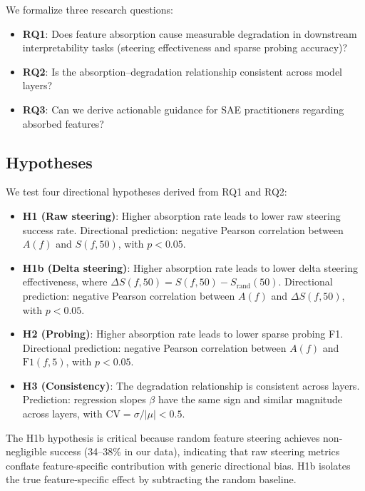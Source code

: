 \documentclass{article}
\begin{document}
We formalize three research questions:

\begin{itemize}
    \item \textbf{RQ1}: Does feature absorption cause measurable degradation in downstream interpretability tasks (steering effectiveness and sparse probing accuracy)?
    \item \textbf{RQ2}: Is the absorption--degradation relationship consistent across model layers?
    \item \textbf{RQ3}: Can we derive actionable guidance for SAE practitioners regarding absorbed features?
\end{itemize}

\subsection{Hypotheses}

We test four directional hypotheses derived from RQ1 and RQ2:

\begin{itemize}
    \item \textbf{H1 (Raw steering)}: Higher absorption rate leads to lower raw steering success rate. Directional prediction: negative Pearson correlation between $A(f)$ and $S(f, 50)$, with $p < 0.05$.
    \item \textbf{H1b (Delta steering)}: Higher absorption rate leads to lower delta steering effectiveness, where $\Delta S(f, 50) = S(f, 50) - S_{\text{rand}}(50)$. Directional prediction: negative Pearson correlation between $A(f)$ and $\Delta S(f, 50)$, with $p < 0.05$.
    \item \textbf{H2 (Probing)}: Higher absorption rate leads to lower sparse probing F1. Directional prediction: negative Pearson correlation between $A(f)$ and $\text{F1}(f, 5)$, with $p < 0.05$.
    \item \textbf{H3 (Consistency)}: The degradation relationship is consistent across layers. Prediction: regression slopes $\beta$ have the same sign and similar magnitude across layers, with $\text{CV} = \sigma / |\mu| < 0.5$.
\end{itemize}

The H1b hypothesis is critical because random feature steering achieves non-negligible success (34--38\% in our data), indicating that raw steering metrics conflate feature-specific contribution with generic directional bias. H1b isolates the true feature-specific effect by subtracting the random baseline.
\end{document}
